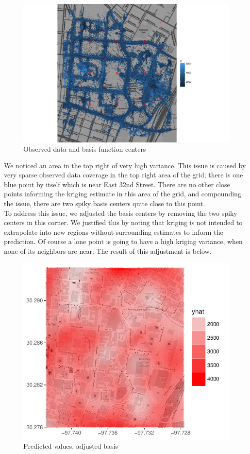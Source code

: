 \documentclass[11pt]{article}
\begin{document}
\begin{figure}[H]
\centering
\includegraphics[width=120mm,keepaspectratio]{Images/data_grid.png}
\caption{Observed data and basis function centers \label{fig:6}}
\end{figure}

We noticed an area in the top right of very high variance.  This issue is caused by very sparse observed data coverage in the top right area of the grid; there is one blue point by itself which is near East 32nd Street.  There are no other close points informing the kriging estimate in this area of the grid, and compounding the issue, there are two spiky basis centers quite close to this point. \\

To address this issue, we adjusted the basis centers by removing the two spiky centers in this corner.  We justified this by noting that kriging is not intended to extrapolate into new regions without surrounding estimates to inform the prediction.  Of course a lone point is going to have a high kriging variance, when none of its neighbors are near. The result of this adjustment is below. \\

\begin{figure}[H]
\centering
\includegraphics[width=120mm,keepaspectratio]{Images/pred_newgrid_origscale.pdf}
\caption{Predicted values, adjusted basis \label{fig:7}}
\end{figure}
\end{document}
